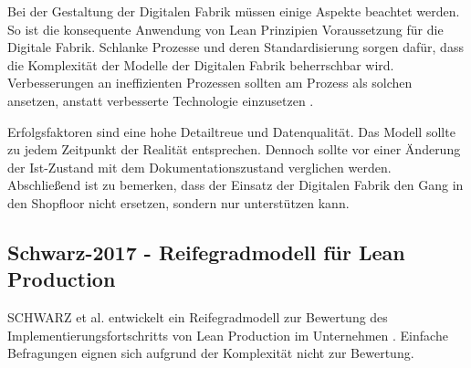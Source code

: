 Bei der Gestaltung der Digitalen Fabrik müssen einige Aspekte beachtet werden. So ist die konsequente Anwendung von Lean Prinzipien Voraussetzung für die Digitale Fabrik. Schlanke Prozesse und deren Standardisierung sorgen dafür, dass die Komplexität der Modelle der Digitalen Fabrik beherrschbar wird. 
Verbesserungen an ineffizienten Prozessen sollten am Prozess als solchen ansetzen, anstatt verbesserte Technologie einzusetzen \autocite{Liker2013}. 

Erfolgsfaktoren sind eine hohe Detailtreue und Datenqualität. Das Modell sollte zu jedem Zeitpunkt der Realität entsprechen. Dennoch sollte vor einer Änderung der Ist-Zustand mit dem Dokumentationszustand verglichen werden. 
% 
Abschließend ist zu bemerken, dass der Einsatz der Digitalen Fabrik den Gang in den Shopfloor nicht ersetzen, sondern nur unterstützen kann. 


\subsection*{Schwarz-2017 - Reifegradmodell für Lean Production}\label{sec:rgmodell}

SCHWARZ et al. entwickelt ein Reifegradmodell zur Bewertung des Implementierungsfortschritts von Lean Production im Unternehmen \autocite{Schwarz2017}. Einfache Befragungen eignen sich aufgrund der Komplexität nicht zur Bewertung. 

